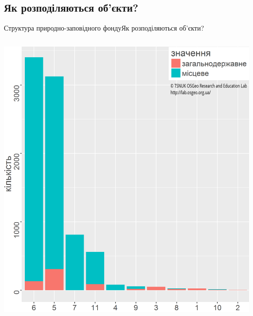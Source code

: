 \documentclass[12pt, aspectratio=1610]{beamer}
\begin{document}
\subsection{Як розподіляються об'єкти?}
\begin{frame}{Структура природно-заповідного фонду}{Як розподіляються об'єкти?}
	\begin{columns}[c]
		
		
		\includegraphics[width=\textwidth]{./figures/quantity.png}%
		
		

\end{columns}
\end{frame}
\end{document}
